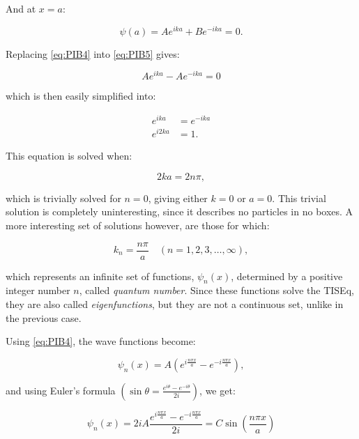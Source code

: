 \documentclass[
  english,
  9pt,
]{extbook}
\theoremstyle{definition}
\theoremstyle{definition}
\theoremstyle{definition}
\theoremstyle{definition}
\theoremstyle{remark}
\begin{document}
And at \(x=a\):

\begin{equation}
\psi(a) = A e^{ika} + B e^{-ika} = 0.
\label{eq:PIB5}
\end{equation}

Replacing \eqref{eq:PIB4} into \eqref{eq:PIB5} gives:

\begin{equation}
A e^{ika} - A e^{-ika} = 0
\label{eq:PIB6}
\end{equation}

which is then easily simplified into:

\begin{equation}
\begin{aligned}
e^{ika} &= e^{-ika}\\
e^{i2ka} &= 1.
\end{aligned}
\label{eq:PIB7}
\end{equation}

This equation is solved when:

\begin{equation}
2ka = 2n\pi,
\label{eq:PIB8}
\end{equation}

which is trivially solved for \(n=0\), giving either \(k=0\) or \(a=0\). This trivial solution is completely uninteresting, since it describes no particles in no boxes. A more interesting set of solutions however, are those for which:

\begin{equation}
k_n = \frac{n\pi}{a} \quad (n = 1, 2, 3,\dots,\infty),
\label{eq:PIB9}
\end{equation}

which represents an infinite set of functions, \(\psi_n(x)\), determined by a positive integer number \(n\), called \emph{quantum number}. Since these functions solve the TISEq, they are also called \emph{eigenfunctions}, but they are not a continuous set, unlike in the previous case.

Using \eqref{eq:PIB4}, the wave functions become:

\begin{equation}
\psi_n(x) = A \left(e^{i\frac{n\pi x}{a}} - e^{-i\frac{n\pi x}{a}}\right),
\label{eq:PIB10}
\end{equation}

and using Euler's formula \(\left(\sin\theta = \frac{e^{i\theta} - e^{-i\theta}}{2i}\right)\), we get:

\begin{equation}
\psi_n(x) = 2iA \frac{e^{i\frac{n\pi x}{a}} - e^{-i\frac{n\pi x}{a}}}{2i} = C \sin\left(\frac{n\pi x}{a}\right)
\label{eq:PIB11}
\end{equation}
\end{document}
